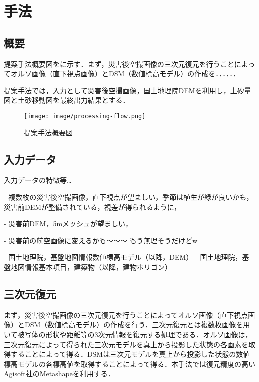 \chapter{手法}
  \section{概要}
    提案手法概要図をに示す．まず，災害後空撮画像の三次元復元を行うことによってオルソ画像（直下視点画像）とDSM（数値標高モデル）の作成を．．．．．．

    提案手法では，入力として災害後空撮画像，国土地理院DEMを利用し，土砂量図と土砂移動図を最終出力結果とする．

    \begin{figure}[t]
      \centering
      \texttt{[image: image/processing-flow.png]}
      \caption{提案手法概要図}
      \label{提案手法概要図}
    \end{figure}


  \section{入力データ}
    \label{入力データ}
    入力データの特徴等\dots

    - 複数枚の災害後空撮画像，直下視点が望ましい，季節は植生が緑が良いかも，災害前DEMが整備されている，視差が得られるように，

    - 災害前DEM，5mメッシュが望ましい，

    - 災害前の航空画像に変えるかも〜〜〜
      もう無理そうだけどw


    - 国土地理院，基盤地図情報数値標高モデル\cite{基盤地図情報}（以降，DEM）
    - 国土地理院，基盤地図情報基本項目，建築物\cite{基盤地図情報}（以降，建物ポリゴン）
    



  \section{三次元復元}
    まず，災害後空撮画像の三次元復元を行うことによってオルソ画像（直下視点画像）とDSM（数値標高モデル）の作成を行う．三次元復元とは複数枚画像を用いて被写体の形状や距離等の3次元情報を復元する処理である．オルソ画像は，三次元復元によって得られた三次元モデルを真上から投影した状態の各画素を取得することによって得る．DSMは三次元モデルを真上から投影した状態の数値標高モデルの各標高値を取得することによって得る．本手法では復元精度の高いAgisoft社のMetashape\cite{Metashape}を利用する．

